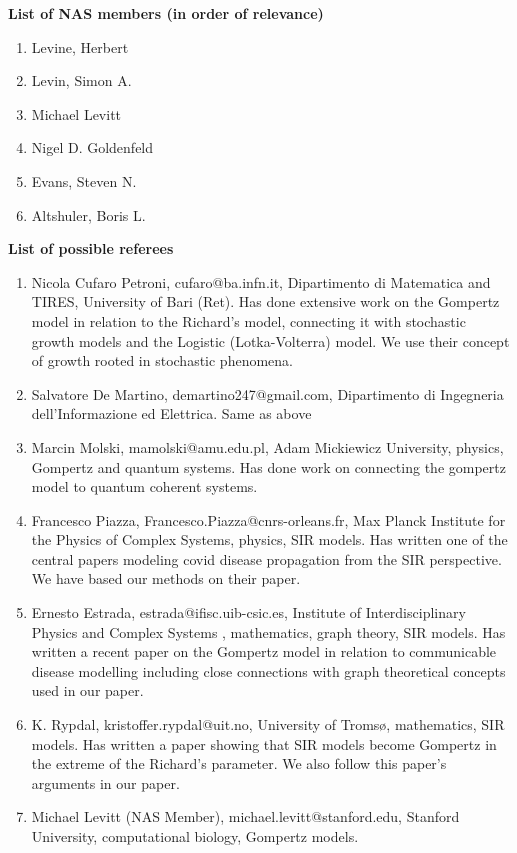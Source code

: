\documentclass[11pt,a4paper,roman]{moderncv}
\begin{document}
\textbf{List of NAS members (in order of relevance)} 
\begin{enumerate}
\item Levine, Herbert
\item Levin, Simon A.
\item Michael Levitt 

\item Nigel D. Goldenfeld 
\item Evans, Steven N.
\item Altshuler, Boris L.
\end{enumerate}
\textbf{List of possible referees}
\begin{enumerate}

\item Nicola Cufaro Petroni, cufaro@ba.infn.it,
Dipartimento di Matematica and TIRES, University of Bari (Ret).
Has done extensive work on the Gompertz model in relation to the Richard's model, connecting it with stochastic growth models and the Logistic (Lotka-Volterra) model. We use their concept of growth rooted in stochastic phenomena.
\item Salvatore De Martino,
demartino247@gmail.com, 
Dipartimento di Ingegneria dell’Informazione ed Elettrica.
Same as above
\item Marcin Molski, mamolski@amu.edu.pl, Adam Mickiewicz University, physics, Gompertz and quantum systems. Has done work on connecting the gompertz model to quantum coherent systems.
\item Francesco Piazza, Francesco.Piazza@cnrs-orleans.fr, Max Planck Institute for the Physics of Complex Systems, physics, SIR models.
Has written one of the central papers modeling covid disease propagation from the SIR perspective. We have based our methods on their paper.
\item Ernesto Estrada, estrada@ifisc.uib-csic.es, Institute of Interdisciplinary Physics and Complex Systems , mathematics, graph theory, SIR models.
Has written a recent paper on the Gompertz model in relation to communicable disease modelling including close connections with graph theoretical concepts used in our paper. 
\item K. Rypdal, kristoffer.rypdal@uit.no, University of Tromsø, mathematics, SIR models.
Has written a paper showing that SIR models become Gompertz in the extreme of the Richard's parameter. We also follow this paper's arguments in our paper.
\item Michael Levitt (NAS Member), michael.levitt@stanford.edu, Stanford University, computational biology, Gompertz models.

\end{enumerate}
\end{document}
